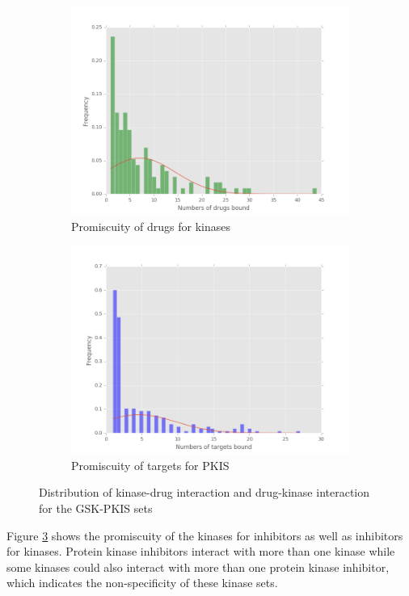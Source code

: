 \documentclass[a4paper, 11pt]{article}
\begin{document}
\begin{figure}[H]
\centering
\begin{subfigure}{.6\textwidth}
  \centering
  \includegraphics[width=\linewidth]{figures/numb_drugs.png}
  \caption{Promiscuity of drugs for kinases}
  \label{targ_drugdis}
\end{subfigure}%
\begin{subfigure}{.6\textwidth}
  \centering
  \includegraphics[width=\linewidth]{figures/num_target.png}
    \caption{Promiscuity of targets for PKIS}
  \label{drugtarg}
\end{subfigure}
\caption{Distribution of kinase-drug interaction and drug-kinase interaction for the GSK-PKIS sets}
\label{targ_dis}
\end{figure}
Figure \ref{targ_dis} shows the promiscuity of the kinases for inhibitors as well as inhibitors for kinases. Protein kinase inhibitors interact with more than one kinase  while some kinases could also interact with more than one protein kinase inhibitor, which indicates the non-specificity of these kinase sets.
\end{document}
